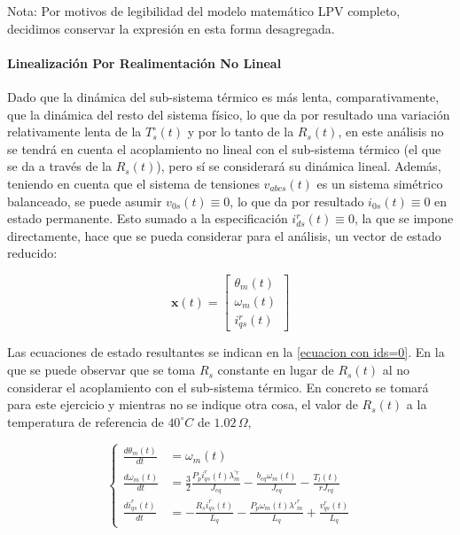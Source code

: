 \documentclass[a4paper, 10pt, onecolumn,journal]{ieeeconf}
\begin{document}
Nota: Por motivos de legibilidad del modelo matemático LPV completo, decidimos conservar la expresión en esta forma desagregada.

\paragraph{\textbf{Linealización Por Realimentación No Lineal}}
Dado que la dinámica del sub-sistema térmico es
más lenta, comparativamente, que la dinámica del resto del sistema físico, lo que da por resultado
una variación relativamente lenta de la $T^{\circ}_s(t)$ y por lo tanto de la $R_s(t)$,
en este análisis no se tendrá en cuenta el acoplamiento no lineal con el sub-sistema térmico (el que se da a través de la $R_s(t)$), 
pero sí se considerará su dinámica lineal. Además, teniendo en cuenta que el sistema de tensiones $v_{abcs}(t)$ es un sistema
simétrico balanceado, se puede asumir $v_{0s}(t) \equiv 0$, lo que da por resultado $i_{0s}(t) \equiv 0$ en estado permanente. Esto sumado a la especificación $i^{r}_{ds}(t)\equiv0$, 
la que se impone directamente, hace que se pueda considerar para el análisis, un vector de estado reducido:

\begin{equation}
    \mathbf{x}(t) = \begin{bmatrix} \theta_m(t) \\ \omega_m(t) \\ i^r_{qs}(t)\end{bmatrix}
    \label{vector de estado reducido}
\end{equation}

Las ecuaciones de estado resultantes se indican en la \cref{ecuacion con ids=0}.
En la que se puede observar que se toma $R_s$ constante en lugar  de $R_s(t)$ al
no considerar el acoplamiento con el sub-sistema térmico. En concreto
se tomará para este ejercicio y mientras no se indique otra cosa, el valor de 
$R_s(t)$ a la temperatura de referencia de $40^\circ C$ de $1.02 \, \Omega$, \cite{c1}%

\begin{equation}
	\begin{cases}
		\frac{d \theta_m(t)}{dt}  &= {\omega}_m(t)\\
		\frac{d \omega_m(t)}{dt}  &= \frac{3}{2} \frac{P_p i^r_{qs}(t)\lambda^{'r}_m}{J_{eq}} - \frac{b_{eq}\omega_m(t)}{J_{eq}} - \frac{T_l(t)}{r J_{eq}}\\
		\frac{d i^r_{qs}(t)}{dt}  &= -\frac{R_s i^r_{qs}(t)}{L_q} - \frac{P_p \omega_m(t) \lambda'^r_m}{L_q}+ \frac{v^r_{qs}(t)}{L_q}
    \end{cases}
	\label{ecuacion con ids=0}
\end{equation}
\end{document}
